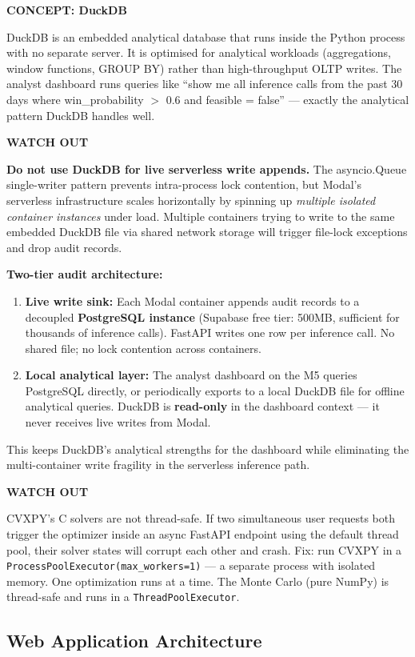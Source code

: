 \documentclass[11pt]{article}
\newcommand{\concept}[2]{%
  \begin{mdframed}[style=conceptbox]
  {\small\bfseries\color{bluefg}CONCEPT: #1}\par\smallskip #2
  \end{mdframed}}
\newcommand{\warnbox}[1]{%
  \begin{mdframed}[style=warnbox]
  {\small\bfseries\color{amberfg}WATCH OUT}\par\smallskip #1
  \end{mdframed}}
\begin{document}
\concept{DuckDB}{
DuckDB is an embedded analytical database that runs inside the Python process with
no separate server. It is optimised for analytical workloads (aggregations, window
functions, GROUP BY) rather than high-throughput OLTP writes. The analyst dashboard
runs queries like ``show me all inference calls from the past 30 days where
win\_probability $>$ 0.6 and feasible = false'' --- exactly the analytical pattern
DuckDB handles well.
}

\warnbox{
\textbf{Do not use DuckDB for live serverless write appends.} The asyncio.Queue
single-writer pattern prevents intra-process lock contention, but Modal's serverless
infrastructure scales horizontally by spinning up \emph{multiple isolated container
instances} under load. Multiple containers trying to write to the same embedded
DuckDB file via shared network storage will trigger file-lock exceptions and drop
audit records.

\textbf{Two-tier audit architecture:}
\begin{enumerate}[leftmargin=1.6em, itemsep=2pt]
  \item \textbf{Live write sink:} Each Modal container appends audit records to a
        decoupled \textbf{PostgreSQL instance} (Supabase free tier: 500MB, sufficient
        for thousands of inference calls). FastAPI writes one row per inference call.
        No shared file; no lock contention across containers.
  \item \textbf{Local analytical layer:} The analyst dashboard on the M5 queries
        PostgreSQL directly, or periodically exports to a local DuckDB file for
        offline analytical queries. DuckDB is \textbf{read-only} in the dashboard
        context --- it never receives live writes from Modal.
\end{enumerate}
This keeps DuckDB's analytical strengths for the dashboard while eliminating the
multi-container write fragility in the serverless inference path.
}

\warnbox{
CVXPY's C solvers are not thread-safe. If two simultaneous user requests both trigger
the optimizer inside an async FastAPI endpoint using the default thread pool, their
solver states will corrupt each other and crash. Fix: run CVXPY in a
\texttt{ProcessPoolExecutor(max\_workers=1)} --- a separate process with isolated
memory. One optimization runs at a time. The Monte Carlo (pure NumPy) is thread-safe
and runs in a \texttt{ThreadPoolExecutor}.
}

\subsection*{Web Application Architecture}
\end{document}
